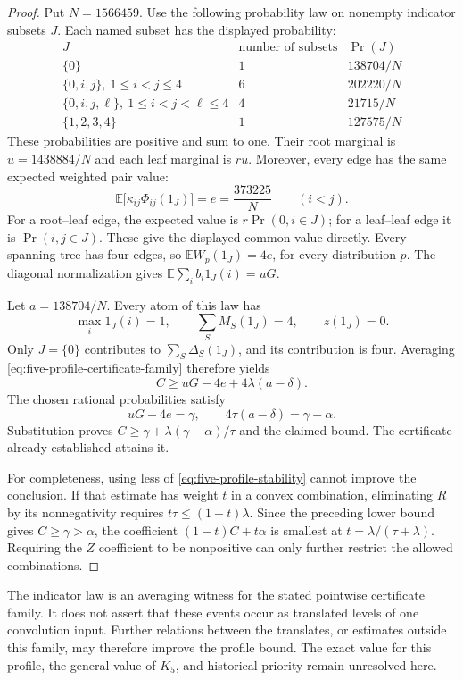 \begin{proof}
Put $N=1566459$.  Use the following probability law on nonempty
indicator subsets $J$.  Each named subset has the displayed
probability:
\[
\begin{array}{c|c|c}
J&\text{number of subsets}&\Pr(J)\\ \hline
\{0\}&1&138704/N\\
\{0,i,j\},\ 1\le i<j\le4&6&202220/N\\
\{0,i,j,\ell\},\ 1\le i<j<\ell\le4&4&21715/N\\
\{1,2,3,4\}&1&127575/N
\end{array}
\]
These probabilities are positive and sum to one.  Their root
marginal is $u=1438884/N$ and each leaf marginal is $ru$.
Moreover, every edge has the same expected weighted pair value:
\[
 \mathbb E\bigl[\kappa_{ij}\Phi_{ij}(1_J)\bigr]
 =e=\frac{373225}{N}\qquad(i<j).
\]
For a root--leaf edge, the expected value is
$r\Pr(0,i\in J)$; for a leaf--leaf edge it is
$\Pr(i,j\in J)$.  These give the displayed common value directly.
Every spanning tree has four edges, so
$\mathbb E W_p(1_J)=4e$, for every distribution $p$.
The diagonal normalization gives
$\mathbb E\sum_i b_i1_J(i)=uG$.

Let $a=138704/N$.  Every atom of this law has
\[
 \max_i1_J(i)=1,\qquad
 \sum_SM_S(1_J)=4,\qquad z(1_J)=0.
\]
Only $J=\{0\}$ contributes to $\sum_S\Delta_S(1_J)$, and its
contribution is four.  Averaging
\eqref{eq:five-profile-certificate-family} therefore yields
\[
 C\ge uG-4e+4\lambda(a-\delta).
\]
The chosen rational probabilities satisfy
\[
 uG-4e=\gamma,\qquad
 4\tau(a-\delta)=\gamma-\alpha.
\]
Substitution proves
$C\ge\gamma+\lambda(\gamma-\alpha)/\tau$ and the claimed bound.
The certificate already established attains it.

For completeness, using less of
\eqref{eq:five-profile-stability} cannot improve the conclusion.
If that estimate has weight $t$ in a convex combination, eliminating
$R$ by its nonnegativity requires
$t\tau\le(1-t)\lambda$.  Since the preceding lower bound gives
$C\ge\gamma>\alpha$, the coefficient $(1-t)C+t\alpha$ is smallest
at $t=\lambda/(\tau+\lambda)$.  Requiring the $Z$ coefficient to
be nonpositive can only further restrict the allowed combinations.
\end{proof}

The indicator law is an averaging witness for the stated pointwise
certificate family.  It does not assert that these events occur as
translated levels of one convolution input.  Further relations
between the translates, or estimates outside this family, may
therefore improve the profile bound.  The exact value for this
profile, the general value of $K_5$, and historical priority remain
unresolved here.


